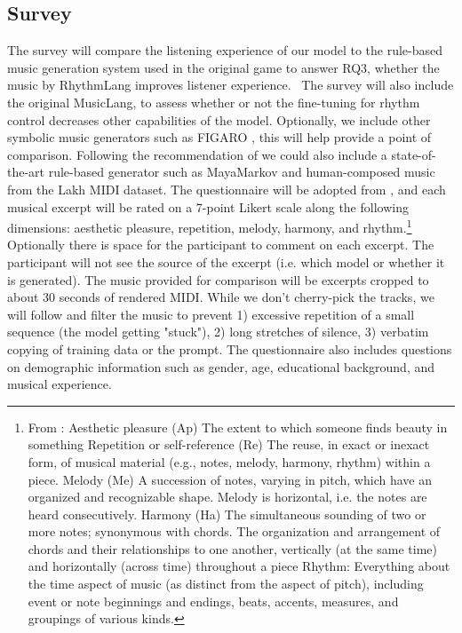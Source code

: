 \subsection{Survey}
The survey will compare the listening experience of our model to the rule-based music generation system used in the original game to answer RQ3, whether the music by RhythmLang improves listener experience.  The survey will also include the original MusicLang, to assess whether or not the fine-tuning for rhythm control decreases other capabilities of the model. Optionally, we include other symbolic music generators such as FIGARO \cite{Rütte_figaro_2023}, this will help provide a point of comparison. Following the recommendation of \cite{Yin_Reuben_Stepney_Collins_2023} we could also include a state-of-the-art rule-based generator such as MayaMarkov \cite{Collins_Laney_2017} and human-composed music from the Lakh MIDI dataset. 
The questionnaire will be adopted from \cite{Yin_Reuben_Stepney_Collins_2023}, and each musical excerpt will be rated on a 7-point Likert scale along the following dimensions: aesthetic pleasure, repetition, melody, harmony, and rhythm.\footnote{From \cite{Yin_Reuben_Stepney_Collins_2023}: Aesthetic pleasure (Ap) The extent to which someone finds beauty in something 
Repetition or self-reference (Re) The reuse, in exact or inexact form, of musical material (e.g., notes, melody, harmony, rhythm) within a piece.
Melody (Me) A succession of notes, varying in pitch, which have an organized and recognizable shape. Melody is horizontal, i.e. the notes are heard consecutively.
Harmony (Ha) The simultaneous sounding of two or more notes; synonymous with chords. The organization and arrangement of chords and their relationships
to one another, vertically (at the same time) and horizontally (across time) throughout a piece
Rhythm: Everything about the time aspect of music (as distinct from the aspect of pitch), including event or note beginnings and endings, beats, accents, measures, and groupings of various kinds.} 
Optionally there is space for the participant to comment on each excerpt. The participant will not see the source of the excerpt (i.e. which model or whether it is generated). 
The music provided for comparison will be excerpts cropped to about 30 seconds of rendered MIDI. While we don't cherry-pick the tracks, we will follow \cite{Yin_Reuben_Stepney_Collins_2023} and filter the music to prevent 1) excessive repetition of a small sequence (the model getting "stuck"), 2) long stretches of silence, 3) verbatim copying of training data or the prompt. 
The questionnaire also includes questions on demographic information such as gender, age, educational background, and musical experience.

